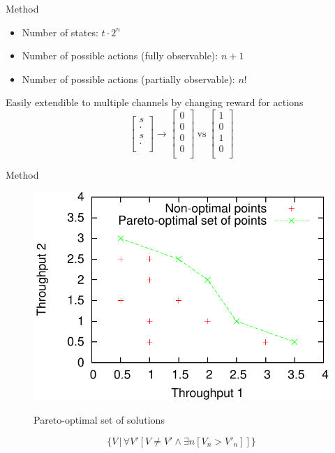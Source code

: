 \documentclass{beamer}
\begin{document}
\begin{frame}{Method}
	\begin{itemize}
		\item Number of states: $t \cdot 2^{n}$
		\item Number of possible actions (fully observable): $n+1$
		\item Number of possible actions (partially observable): $n!$
	\end{itemize}
	Easily extendible to multiple channels by changing reward for actions
	$$\begin{bmatrix}
		s\\
		\cdot\\
		s\\
		\cdot\\
	\end{bmatrix}
	\rightarrow
	\begin{bmatrix}
		0\\
		0\\
		0\\
		0\\
	\end{bmatrix}
	~\textrm{vs}~
	\begin{bmatrix}
		1\\
		0\\
		1\\
		0\\
	\end{bmatrix}$$
\end{frame}


\begin{frame}{Method}
	\begin{figure}
		\caption{Pareto-optimal set of solutions}
		\includegraphics[scale=0.5]{../../images/pareto}
	   \label{fig:pareto}
	\end{figure}
	\begin{equation}
		\label{eq:pareto}
		\Big\{ V\, \Big| \, \forall V'[ V \neq V' \land \exists n [V_n > V'_n]] \Big\}
	\end{equation}
\end{frame}
\end{document}
